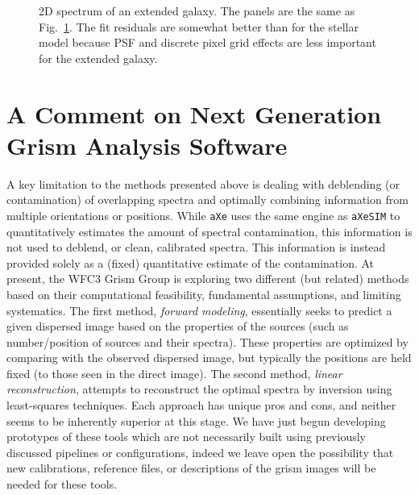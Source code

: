 \documentclass[preprint]{aastex}
\begin{document}
\begin{figure}
    \caption{2D spectrum of an extended galaxy.  The panels are the same as Fig.~\ref{fig:gal2D}.  The fit residuals are somewhat better than for the stellar model because PSF and discrete pixel grid effects are less important for the extended galaxy.}
    \label{fig:gal2D}
\end{figure}

\section{A Comment on Next Generation Grism Analysis Software}\label{sec:nextgen} 

A key limitation to the methods presented above is dealing with deblending (or contamination) of overlapping spectra and optimally combining information from multiple orientations or positions.  
While \texttt{aXe} uses the same engine as \texttt{aXeSIM} to quantitatively estimates the amount of spectral contamination, this information is not used to deblend, or clean, calibrated spectra. This information is instead provided solely as a (fixed) quantitative estimate of the contamination. At present, the WFC3 Grism Group is exploring two different (but related) methods based on their computational feasibility, fundamental assumptions, and limiting systematics.  The first method, {\it forward modeling}, essentially seeks to predict a given dispersed image based on the properties of the sources (such as number/position of sources and their spectra).  These properties are optimized by comparing with the observed dispersed image, but typically the positions are held fixed (to those seen in the direct image).  The second method, {\it linear reconstruction}, attempts to reconstruct the optimal spectra by inversion using least-squares techniques.  Each approach has unique pros and cons, and neither seems to be inherently superior at this stage.  We have just begun developing prototypes of these tools which are not necessarily built using previously discussed pipelines or configurations, indeed we leave open the possibility that new calibrations, reference files, or descriptions of the grism images will be needed for these tools.  


\newpage

\appendix
\end{document}
